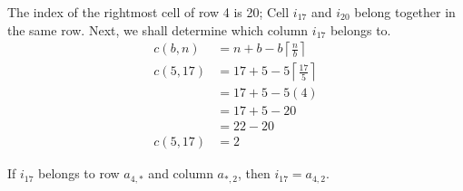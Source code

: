 \documentclass[letterpaper, twoside,12pt]{book}
\begin{document}
    The index of the rightmost cell of row 4 is 20; Cell $i_{17}$ and $i_{20}$ belong together in the same row. Next, we shall determine which column $i_{17}$ belongs to.
    \begin{equation*}
        \begin{split}
            c(b,n) &= n + b - b\left\lceil \frac{n}{b} \right\rceil \\
            c(5,17) &= 17 + 5 - 5\left\lceil \frac{17}{5} \right\rceil \\
                &= 17 + 5 - 5(4) \\
                &= 17 + 5 - 20 \\
                &= 22 - 20 \\
            c(5,17) &= 2
        \end{split}
    \end{equation*}

    \newpage

    If $i_{17}$ belongs to row $a_{4,*}$ and column $a_{*,2}$, then $i_{17} = a_{4,2}$.
\end{document}

